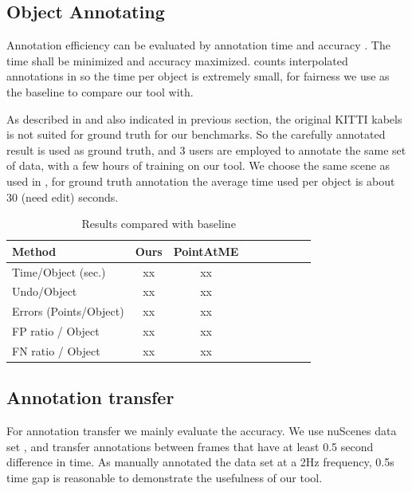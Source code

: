 \documentclass[letterpaper, 10 pt, conference]{ieeeconf}  %
\begin{document}
\subsection{Object Annotating}

Annotation efficiency can be evaluated by annotation time and accuracy\cite{pointatme} \cite{Zimmer20193DBA}. The time shall be minimized and accuracy maximized. \cite{Zimmer20193DBA} counts interpolated annotations in so the time per object is extremely small, for fairness we use \cite{pointatme} as the baseline to compare our tool with.

As described in \cite{pointatme} and also indicated in previous section, the original KITTI kabels is not suited for ground truth for our benchmarks. So the carefully annotated result is used as ground truth, and 3 users are employed to annotate the same set of data, with a few hours of training on our tool. We choose the same scene as used in \cite{pointatme}, for ground truth annotation the average time used per object is about 30 (need edit) seconds.

\begin{table}[h]
	\centering
	\caption{Results compared with baseline}
	\label{tab:metrics}
	\begin{tabular}{|l|c|c|c|c||c|c|c|c|}
		\hline
		\textbf{Method} & \textbf{Ours} & \textbf{PointAtME\cite{pointatme}} \\
		\hline
		\hline
		Time/Object (sec.) & xx & xx\\
		\hline
		Undo/Object & xx & xx\\
		\hline
		Errors (Points/Object) & xx & xx\\
		\hline
		FP ratio / Object & xx & xx\\
		\hline
		FN ratio / Object & xx & xx\\
		\hline
	\end{tabular}
\end{table}


\subsection{Annotation transfer}
For annotation transfer we mainly evaluate the accuracy. We use nuScenes data set \cite{Caesar2019nuScenesAM}, and transfer annotations between frames that have at least 0.5 second difference in time. As \cite{Caesar2019nuScenesAM} \cite{Patil2019TheHD} manually annotated the data set at a 2Hz frequency, 0.5s time gap is reasonable to demonstrate the usefulness of our tool.
\end{document}
